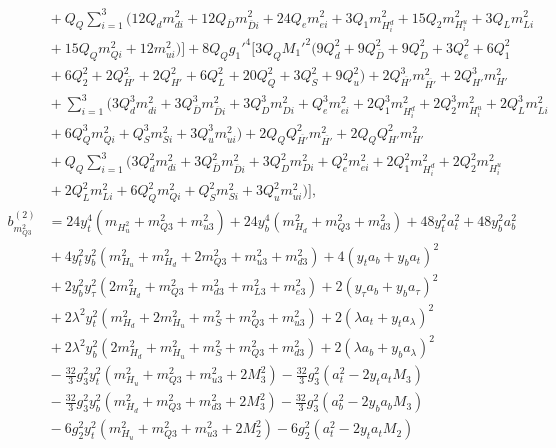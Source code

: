 \documentclass[preprint,amsmath,amssymb,aps,superscriptaddress,prd,showpacs,floatfix,nofootinbib]{revtex4-1}
\begin{document}
\begin{subequations}
\begin{align}
&{}+Q_Q\sum_{i=1}^3\big ( 12Q_dm_{di}^2+12Q_{\overline{D}}m_{\overline{D}i}^2+24Q_em_{ei}^2+3Q_1m_{H_i^d}^2+15Q_2m_{H_i^u}^2+3Q_Lm_{Li}^2\nonumber\\
&{}+15Q_Qm_{Qi}^2+12m_{ui}^2\big )\bigg ]+8Q_Qg_1'^4\bigg [ 3Q_QM_1'^2\big ( 9Q_d^2+9Q_{\overline{D}}^2+9Q_D^2+3Q_e^2+6Q_1^2\nonumber\\
&{}+6Q_2^2+2Q_{\overline{H'}}^2+2Q_{H'}^2+6Q_L^2+20Q_Q^2+3Q_S^2+9Q_u^2\big )+2Q_{\overline{H'}}^3m_{\overline{H'}}^2+2Q_{H'}^3m_{H'}^2\nonumber\\
&{}+\sum_{i=1}^3\big ( 3Q_d^3m_{di}^2+3Q_{\overline{D}}^3m_{\overline{D}i}^2+3Q_D^3m_{Di}^2+Q_e^3m_{ei}^2+2Q_1^3m_{H_i^d}^2+2Q_2^3m_{H_i^u}^2+2Q_L^3m_{Li}^2\nonumber\\
&{}+6Q_Q^3m_{Qi}^2+Q_S^3m_{Si}^2+3Q_u^3m_{ui}^2\big )+2Q_QQ_{\overline{H'}}^2m_{\overline{H'}}^2+2Q_QQ_{H'}^2m_{H'}^2\nonumber\\
&{}+Q_Q\sum_{i=1}^3\big ( 3Q_d^2m_{di}^2+3Q_{\overline{D}}^2m_{\overline{D}i}^2+3Q_D^2m_{Di}^2+Q_e^2m_{ei}^2+2Q_1^2m_{H_i^d}^2+2Q_2^2m_{H_i^u}^2\nonumber\\
&{}+2Q_L^2m_{Li}^2+6Q_Q^2m_{Qi}^2+Q_S^2m_{Si}^2+3Q_u^2m_{ui}^2\big )\bigg ],\label{eq:USSMmq222BetaTwoLoop}\\
b_{m_{Q3}^2}^{(2)}&=24y_t^4\left ( m_{H_u^2}+m_{Q3}^2+m_{u3}^2\right )+24y_b^4\left ( m_{H_d}^2+m_{Q3}^2+m_{d3}^2\right )+48y_t^2a_t^2+48y_b^2a_b^2\nonumber\\
&{}+4y_t^2y_b^2\left ( m_{H_u}^2+m_{H_d}^2+2m_{Q3}^2+m_{u3}^2+m_{d3}^2\right )+4\left ( y_ta_b+y_ba_t\right )^2\nonumber\\
&{}+2y_b^2y_\tau^2\left ( 2m_{H_d}^2+m_{Q3}^2+m_{d3}^2+m_{L3}^2+m_{e3}^2\right )+2\left ( y_\tau a_b+y_ba_\tau\right )^2\nonumber\\
&{}+2\lambda^2y_t^2\left ( m_{H_d}^2+2m_{H_u}^2+m_S^2+m_{Q3}^2+m_{u3}^2\right )+2\left ( \lambda a_t+y_ta_\lambda\right )^2\nonumber\\
&{}+2\lambda^2y_b^2\left ( 2m_{H_d}^2+m_{H_u}^2+m_S^2+m_{Q3}^2+m_{d3}^2\right )+2\left ( \lambda a_b+y_ba_\lambda\right )^2\nonumber\\
&{}-\frac{32}{3}g_3^2y_t^2\left ( m_{H_u}^2+m_{Q3}^2+m_{u3}^2+2M_3^2\right )-\frac{32}{3}g_3^2\left ( a_t^2-2y_ta_tM_3\right )\nonumber\\
&{}-\frac{32}{3}g_3^2y_b^2\left ( m_{H_d}^2+m_{Q3}^2+m_{d3}^2+2M_3^2\right )-\frac{32}{3}g_3^2\left ( a_b^2-2y_ba_bM_3\right )\nonumber\\
&{}-6g_2^2y_t^2\left ( m_{H_u}^2+m_{Q3}^2+m_{u3}^2+2M_2^2\right )-6g_2^2\left ( a_t^2-2y_ta_tM_2\right )\nonumber\\

\end{align}
\end{subequations}
\end{document}
